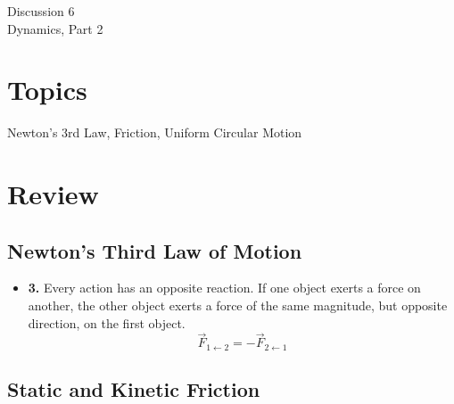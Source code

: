 \documentclass[11pt]{article}
\theoremstyle{gangnamstyle}{\newtheorem{definition}{Definition}[]}
\theoremstyle{gangnamstyle}{\newtheorem{example}{Example}[]}
\theoremstyle{gangnamstyle}{\newtheorem{problem}{Problem}[]}
\begin{document}
\normalfont
\pagestyle{pages}


\begin{center}
\vspace{3in}
{\Large Discussion 6 } \\ [0.05in]
Dynamics, Part 2 \\ [-0.5in]
\end{center}

\section*{Topics}
Newton's 3rd Law, Friction, Uniform Circular Motion

\section{Review}
\subsection{Newton's Third Law of Motion}

\begin{itemize}
\item \textbf{3.} Every action has an opposite reaction. If one object exerts a force on another, the other object exerts a force of the same magnitude, but opposite direction, on the first object. 
\[ \Vec{F}_{1\leftarrow2} = - \Vec{F}_{2\leftarrow1}\]
\end{itemize}

\subsection{Static and Kinetic Friction}
\end{document}
